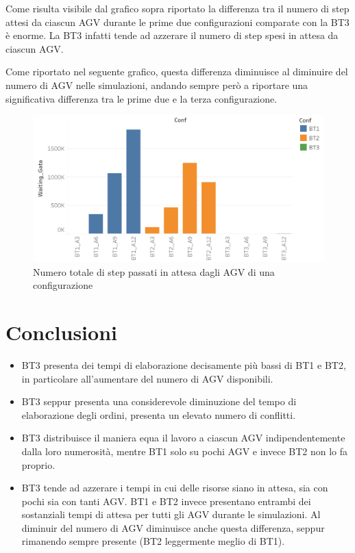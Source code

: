 \documentclass[12pt]{article}
\begin{document}
\noindent Come risulta visibile dal grafico sopra riportato la differenza tra il numero di step attesi da ciascun AGV durante le prime due configurazioni comparate con la BT3 è enorme. La BT3 infatti tende ad azzerare il numero di step spesi in attesa da ciascun AGV.

\newpage 

\noindent Come riportato nel seguente grafico, questa differenza diminuisce al diminuire del numero di AGV nelle simulazioni, andando sempre però a riportare una significativa differenza tra le prime due e la terza configurazione.

\begin{figure}[H]
\centering
  \includegraphics[width=1\linewidth]{Figures/Results_Graphics/Waiting_Total.png}
  \caption{Numero totale di step passati in attesa dagli AGV di una configurazione}\label{fig:waiting_total}
\end{figure}


\newpage
\section{Conclusioni}
\begin{itemize}
\item BT3 presenta dei tempi di elaborazione decisamente più bassi di BT1 e BT2, in particolare all'aumentare del numero di AGV disponibili.
\item BT3 seppur presenta una considerevole diminuzione del tempo di elaborazione degli ordini, presenta un elevato numero di conflitti. 
\item BT3 distribuisce il maniera equa il lavoro a ciascun AGV indipendentemente dalla loro numerosità, mentre BT1 solo su pochi AGV e invece BT2 non lo fa proprio.
\item BT3 tende ad azzerare i tempi in cui delle risorse siano in attesa, sia con pochi sia con tanti AGV. BT1 e BT2 invece presentano entrambi dei sostanziali tempi di attesa per tutti gli AGV durante le simulazioni. Al diminuir del numero di AGV diminuisce anche questa differenza, seppur rimanendo sempre presente (BT2 leggermente meglio di BT1).
\end{itemize}
\end{document}
